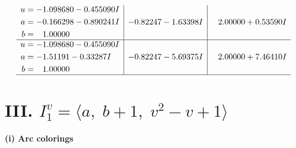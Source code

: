 \documentclass[1p]{elsarticle_modified}
\theoremstyle{definition}
\begin{document}
$$\begin{array}{c|c|c}
\begin{aligned}
u &= -1.098680 - 0.455090 I \\
a &= -0.166298 - 0.890241 I \\
b &= \phantom{-}1.00000\phantom{ +0.000000I}\end{aligned}
 & -0.82247 - 1.63398 I & \phantom{-}2.00000 + 0.53590 I \\ \hline\begin{aligned}
u &= -1.098680 - 0.455090 I \\
a &= -1.51191 - 0.33287 I \\
b &= \phantom{-}1.00000\phantom{ +0.000000I}\end{aligned}
 & -0.82247 - 5.69375 I & \phantom{-}2.00000 + 7.46410 I\\
 \hline 
 \end{array}$$\newpage\newpage\renewcommand{\arraystretch}{1}
\centering \section*{III. $I^v_{1}= \langle a,\;b+1,\;v^2- v+1 \rangle$}
\flushleft \textbf{(i) Arc colorings}\\
\end{document}
